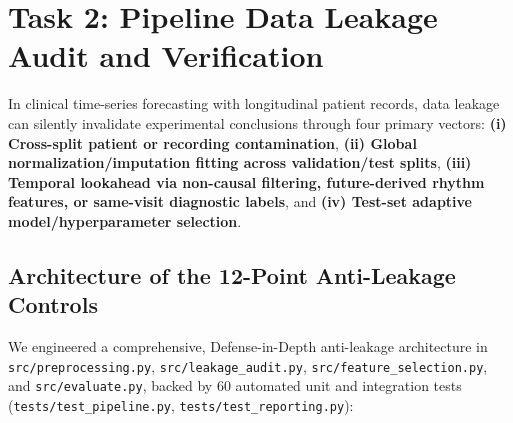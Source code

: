 \documentclass[11pt,a4paper]{article}
\begin{document}
\begin{table}[H]
\centering
\caption{Downstream LSTM validation forecasting ablation across preprocessing regimes P0--P3 ($100\text{ Hz}$ screening cohort).}
\label{tab:preproc_ablation}
\small
{}
\end{table}

\section{Task 2: Pipeline Data Leakage Audit and Verification}
\label{sec:leakage_audit}

In clinical time-series forecasting with longitudinal patient records, data leakage can silently invalidate experimental conclusions through four primary vectors: \textbf{(i) Cross-split patient or recording contamination}, \textbf{(ii) Global normalization/imputation fitting across validation/test splits}, \textbf{(iii) Temporal lookahead via non-causal filtering, future-derived rhythm features, or same-visit diagnostic labels}, and \textbf{(iv) Test-set adaptive model/hyperparameter selection}.

\subsection{Architecture of the 12-Point Anti-Leakage Controls}
We engineered a comprehensive, Defense-in-Depth anti-leakage architecture in \texttt{src/preprocessing.py}, \texttt{src/leakage\_audit.py}, \texttt{src/feature\_selection.py}, and \texttt{src/evaluate.py}, backed by $60$ automated unit and integration tests (\texttt{tests/test\_pipeline.py}, \texttt{tests/test\_reporting.py}):
\end{document}
